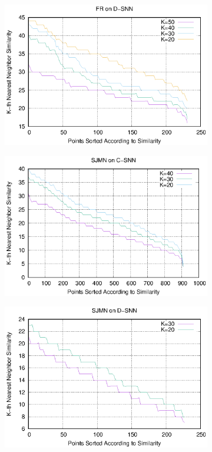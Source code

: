 \documentclass[preprint,12pt,authoryear,review]{elsarticle}
\begin{document}
\begin{figure}[!htbp]
\begin{subfigure}[b]{0.37\textwidth}
        \includegraphics[width=\textwidth]{FR_D-SNN.eps}
        \label{fig:fr_tun_dsnn}
    \end{subfigure}
    \begin{subfigure}[b]{0.37\textwidth}
        \includegraphics[width=\textwidth]{SJMN_C-SNN.eps}
        \label{fig:sjmn_tun_csnn}
    \end{subfigure}
    \begin{subfigure}[b]{0.37\textwidth}
        \includegraphics[width=\textwidth]{SJMN_D-SNN.eps}

\end{subfigure}
\end{figure}
\end{document}
